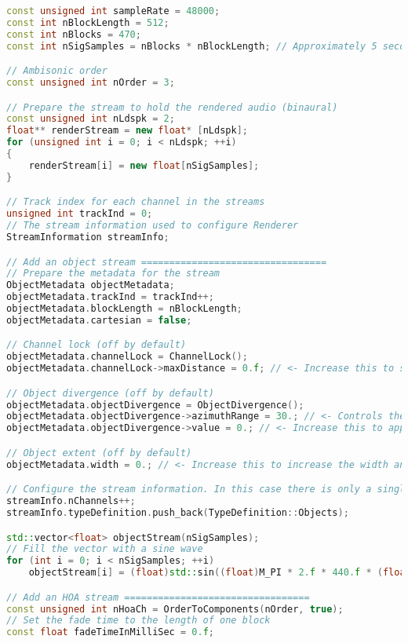 \documentclass[12pt]{report}
\begin{document}
\begin{lstlisting}[language=C++]
const unsigned int sampleRate = 48000;
const int nBlockLength = 512;
const int nBlocks = 470;
const int nSigSamples = nBlocks * nBlockLength; // Approximately 5 seconds @ 48 kHz

// Ambisonic order
const unsigned int nOrder = 3;

// Prepare the stream to hold the rendered audio (binaural)
const unsigned int nLdspk = 2;
float** renderStream = new float* [nLdspk];
for (unsigned int i = 0; i < nLdspk; ++i)
{
    renderStream[i] = new float[nSigSamples];
}

// Track index for each channel in the streams
unsigned int trackInd = 0;
// The stream information used to configure Renderer
StreamInformation streamInfo;

// Add an object stream =================================
// Prepare the metadata for the stream
ObjectMetadata objectMetadata;
objectMetadata.trackInd = trackInd++;
objectMetadata.blockLength = nBlockLength;
objectMetadata.cartesian = false;

// Channel lock (off by default)
objectMetadata.channelLock = ChannelLock();
objectMetadata.channelLock->maxDistance = 0.f; // <- Increase this to see the signal snap to fully in the left loudspeaker

// Object divergence (off by default)
objectMetadata.objectDivergence = ObjectDivergence();
objectMetadata.objectDivergence->azimuthRange = 30.; // <- Controls the width of the divergence
objectMetadata.objectDivergence->value = 0.; // <- Increase this to apply object divergence

// Object extent (off by default)
objectMetadata.width = 0.; // <- Increase this to increase the width and spread the Object over more adjacent loudspeakers

// Configure the stream information. In this case there is only a single channel stream
streamInfo.nChannels++;
streamInfo.typeDefinition.push_back(TypeDefinition::Objects);

std::vector<float> objectStream(nSigSamples);
// Fill the vector with a sine wave
for (int i = 0; i < nSigSamples; ++i)
    objectStream[i] = (float)std::sin((float)M_PI * 2.f * 440.f * (float)i / (float)sampleRate);

// Add an HOA stream =================================
const unsigned int nHoaCh = OrderToComponents(nOrder, true);
// Set the fade time to the length of one block
const float fadeTimeInMilliSec = 0.f;


\end{lstlisting}
\end{document}
